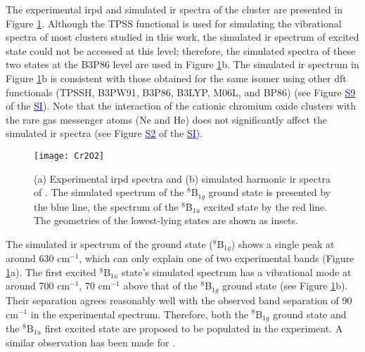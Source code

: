 \begin{refsection}
The experimental \acrshort{irpd} and simulated \acrshort{ir} spectra of the  cluster are presented in Figure \ref{fig:Cr2O2}. Although the TPSS functional is used for simulating the vibrational spectra of most clusters studied in this work, the simulated \acrshort{ir} spectrum of excited state  could not be accessed at this level; therefore, the simulated spectra of these two states at the B3P86 level are used in Figure \ref{fig:Cr2O2}b. The simulated \acrshort{ir} spectrum in Figure \ref{fig:Cr2O2}b is consistent with those obtained for the same isomer using other \acrshort{dft} functionals (TPSSH, B3PW91, B3P86, B3LYP, M06L, and BP86) (see Figure \href{https://pubs.acs.org/doi/suppl/10.1021/acs.jpcc.8b10035/suppl_file/jp8b10035_si_002.pdf}{\textcolor{blue}{S9}} of the \href{https://pubs.acs.org/doi/suppl/10.1021/acs.jpcc.8b10035/suppl_file/jp8b10035_si_002.pdf}{\textcolor{blue}{SI}}). Note that the interaction of the cationic chromium oxide clusters with the rare gas messenger atoms (Ne and He) does not significantly affect the simulated \acrshort{ir} spectra (see Figure \href{https://pubs.acs.org/doi/suppl/10.1021/acs.jpcc.8b10035/suppl_file/jp8b10035_si_002.pdf}{\textcolor{blue}{S2}} of the \href{https://pubs.acs.org/doi/suppl/10.1021/acs.jpcc.8b10035/suppl_file/jp8b10035_si_002.pdf}{\textcolor{blue}{SI}}). 

\begin{figure}[htb!]
	\centering
	\texttt{[image: Cr2O2]}
	\caption{(a) Experimental \acrshort{irpd} spectra and (b) simulated harmonic \acrshort{ir} spectra of . The simulated spectrum of the $^8$B$_{1g}$ ground state is presented by the blue line, the spectrum of the $^8$B$_{1u}$ excited state by the red line. The geometries of the lowest-lying states are shown as insets.}
	\label{fig:Cr2O2}
\end{figure}



The simulated \acrshort{ir} spectrum of the ground state ($^8$B$_{1g}$) shows a single peak at around 630 cm$^{-1}$, which can only explain one of two experimental bands (Figure \ref{fig:Cr2O2}a). The first excited $^8$B$_{1u}$ state's simulated spectrum has a vibrational mode at around 700 cm$^{-1}$, 70 cm$^{-1}$ above that of the $^8$B$_{1g}$ ground state (see Figure \ref{fig:Cr2O2}b). Their separation agrees reasonably well with the observed band separation of 90 cm$^{-1}$ in the experimental spectrum. Therefore, both the $^8$B$_{1g}$ ground state and the $^8$B$_{1u}$ first excited state are proposed to be populated in the experiment. A similar observation has been made for . \cite{nhanCr2O2} 





\end{refsection}

